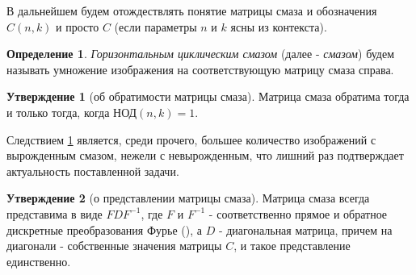 \documentclass[a4paper]{article}
\theoremstyle{definition}
\newtheorem{statement}{Утверждение}[section]
\newtheorem{definition}{Определение}[section]
\begin{document}
    В дальнейшем будем отождествлять понятие матрицы смаза и обозначения $C(n, k)$ и просто $C$ (если параметры $n$ и $k$ ясны из контекста).
\vspace{0.3cm}


    \begin{definition}
    \label{blur}
	\emph{Горизонтальным циклическим смазом} (далее - \emph{смазом}) будем называть умножение изображения на соответствующую матрицу смаза справа.
    \end{definition}


    \begin{statement}[об обратимости матрицы смаза]
    \label{inverse}
	Матрица смаза обратима тогда и только тогда, когда НОД$(n, k) = 1$.
    \end{statement}


    Следствием \ref{inverse} является, среди прочего, большее количество изображений с вырожденным смазом, нежели с невырожденным, что лишний раз подтверждает актуальность поставленной задачи.


    \begin{statement}[о представлении матрицы смаза]
    \label{fourier}
        Матрица смаза всегда представима в виде $FDF^{-1}$, где $F$ и $F^{-1}$ - соответственно прямое и обратное дискретные преобразования Фурье (\cite{fft_def}), а $D$ - диагональная матрица, причем на диагонали - собственные значения матрицы $C$, и такое представление единственно.

    \end{statement}
\end{document}
